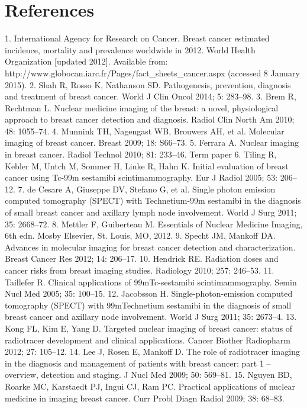 \documentclass{article}
\begin{document}
\section{References}
1. International Agency for Research on Cancer. Breast cancer estimated incidence, mortality 
and prevalence worldwide in 2012. World Health Organization [updated 2012]. Available 
from: http://www.globocan.iarc.fr/Pages/fact_sheets_cancer.aspx (accessed 8 January 
2015).
2. Shah R, Rosso K, Nathanson SD. Pathogenesis, prevention, diagnosis and treatment of 
breast cancer. World J Clin Oncol 2014; 5: 283–98.
3. Brem R, Rechtman L. Nuclear medicine imaging of the breast: a novel, physiological 
approach to breast cancer detection and diagnosis. Radiol Clin North Am 2010; 48: 1055–74. 
4. Munnink TH, Nagengast WB, Brouwers AH, et al. Molecular imaging of breast cancer. Breast 
2009; 18: S66–73.
5. Ferrara A. Nuclear imaging in breast cancer. Radiol Technol 2010; 81: 233–46. 
Term paper
6. Tiling R, Kebler M, Untch M, Sommer H, Linke R, Hahn K. Initial evaluation of breast cancer 
using Tc-99m sestamibi scintimammography. Eur J Radiol 2005; 53: 206–12. 
7. de Cesare A, Giuseppe DV, Stefano G, et al. Single photon emission computed tomography 
(SPECT) with Technetium-99m sestamibi in the diagnosis of small breast cancer and axillary 
lymph node involvement. World J Surg 2011; 35: 2668–72.
8. Mettler F, Guiberteau M. Essentials of Nuclear Medicine Imaging, 6th edn. Mosby Elsevier, 
St. Louis, MO, 2012.
9. Specht JM, Mankoff DA. Advances in molecular imaging for breast cancer detection and 
characterization. Breast Cancer Res 2012; 14: 206–17. 
10. Hendrick RE. Radiation doses and cancer risks from breast imaging studies. Radiology 2010; 
257: 246–53.
11. Taillefer R. Clinical applications of 99mTc-sestamibi scintimammography. Semin Nucl Med 
2005; 35: 100–15. 
12. Jacobsson H. Single-photon-emission computed tomography (SPECT) with 99mTechnetium 
sestamibi in the diagnosis of small breast cancer and axillary node involvement. World J Surg 
2011; 35: 2673–4. 
13. Kong FL, Kim E, Yang D. Targeted nuclear imaging of breast cancer: status of radiotracer 
development and clinical applications. Cancer Biother Radiopharm 2012; 27: 105–12. 
14. Lee J, Rosen E, Mankoff D. The role of radiotracer imaging in the diagnosis and management 
of patients with breast cancer: part 1 – overview, detection and staging. J Nucl Med 2009; 
50: 569–81. 
15. Nguyen BD, Roarke MC, Karstaedt PJ, Ingui CJ, Ram PC. Practical applications of nuclear 
medicine in imaging breast cancer. Curr Probl Diagn Radiol 2009; 38: 68–83. 
\end{document}
